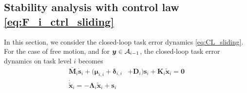 \documentclass[../main.tex]{subfiles}
\begin{document}
\subsection{Stability analysis with control law \eqref{eq:F_i_ctrl_sliding}}
\label{sec:stability-sliding}

In this section, we consider the closed-loop task error dynamics \eqref{eq:CL_sliding}. For the case of free motion, and for $\bm{y} \in {\cal{A}}_{i-1}$, the closed-loop task error dynamics on task level $i$ becomes
\begin{subequations}
    \label{eq:CL_sliding_free}
    \begin{align}
        \bar{\bm{M}}_i \dot{\bm{s}}_i
        + (\bm{\mu}_{i,i} + \bm{\delta}_{i,i} &+ \bm{D}_i)\bm{s}_i
        + \bm{K}_i \tilde{\bm{x}}_i
        = \bm{0} \\
        \dot{\tilde{\bm{x}}}_i = - \bm{\Lambda}_i \tilde{\bm{x}}_i + \bm{s}_i&
    \end{align}
\end{subequations}


\end{document}
